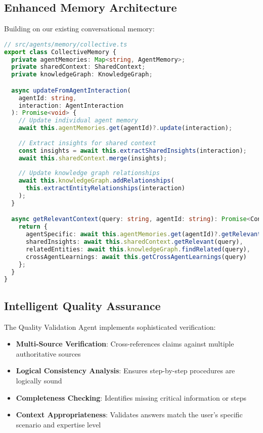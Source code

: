 \documentclass[11pt, a4paper]{article}
\begin{document}
\subsection{Enhanced Memory Architecture}

Building on our existing conversational memory:

\begin{lstlisting}[language=TypeScript, caption=Multi-Agent Memory System]
// src/agents/memory/collective.ts
export class CollectiveMemory {
  private agentMemories: Map<string, AgentMemory>;
  private sharedContext: SharedContext;
  private knowledgeGraph: KnowledgeGraph;

  async updateFromAgentInteraction(
    agentId: string, 
    interaction: AgentInteraction
  ): Promise<void> {
    // Update individual agent memory
    await this.agentMemories.get(agentId)?.update(interaction);
    
    // Extract insights for shared context
    const insights = await this.extractSharedInsights(interaction);
    await this.sharedContext.merge(insights);
    
    // Update knowledge graph relationships
    await this.knowledgeGraph.addRelationships(
      this.extractEntityRelationships(interaction)
    );
  }

  async getRelevantContext(query: string, agentId: string): Promise<ContextBundle> {
    return {
      agentSpecific: await this.agentMemories.get(agentId)?.getRelevant(query),
      sharedInsights: await this.sharedContext.getRelevant(query),
      relatedEntities: await this.knowledgeGraph.findRelated(query),
      crossAgentLearnings: await this.getCrossAgentLearnings(query)
    };
  }
}
\end{lstlisting}

\subsection{Intelligent Quality Assurance}

The Quality Validation Agent implements sophisticated verification:

\begin{itemize}
    \item \textbf{Multi-Source Verification}: Cross-references claims against multiple authoritative sources
    \item \textbf{Logical Consistency Analysis}: Ensures step-by-step procedures are logically sound
    \item \textbf{Completeness Checking}: Identifies missing critical information or steps
    \item \textbf{Context Appropriateness}: Validates answers match the user's specific scenario and expertise level
\end{itemize}
\end{document}
